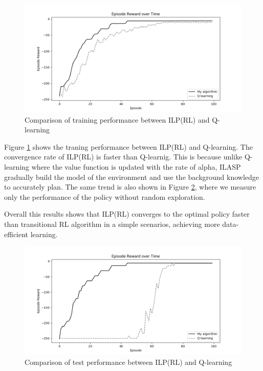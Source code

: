 \begin{figure}[!htb]
\centering
\includegraphics[width=1.0\textwidth]{./figures/experiment1_training}
\caption{Comparison of training performance between ILP(RL) and Q-learning}
\label{experiment1_training}
\end{figure}

Figure \ref{experiment1_training} shows the traning performance between ILP(RL) and Q-learning.
The convergence rate of ILP(RL) is faster than Q-learnig. This is because unlike Q-learning where the value function is updated with the rate of alpha, 
ILASP gradually build the model of the environment and use the background knowledge to accurately plan. 
The same trend is also shown in Figure \ref{experiment1_test}, where we measure only the performance of the policy without random exploration.

Overall this results shows that ILP(RL) converges to the optimal policy faster than transitional RL algorithm in a simple scenarios, achieving more data-efficient learning.

\begin{figure}[!htb]
\centering
\includegraphics[width=1.0\textwidth]{./figures/experiment1_test}
\caption{Comparison of test performance between ILP(RL) and Q-learning}
\label{experiment1_test}
\end{figure}

